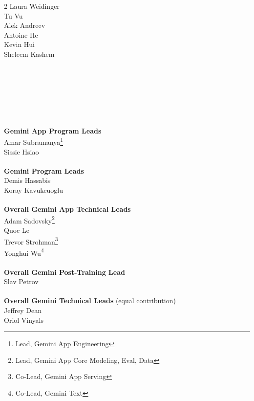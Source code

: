 \begin{multicols}{2}
Laura Weidinger \\
Tu Vu \\
Alek Andreev \\
Antoine He \\
Kevin Hui \\
Sheleem Kashem \\
\\
\\
\\
\\
\\
\\
\\
\textbf{Gemini App Program Leads} \\
Amar Subramanya\footnote{Lead, Gemini App Engineering} \\ 
Sissie Hsiao \\
\\
\textbf{Gemini Program Leads} \\
Demis Hassabis \\
Koray Kavukcuoglu \\
\\
\textbf{Overall Gemini App Technical Leads} \\
Adam Sadovsky\footnote{Lead, Gemini App Core Modeling, Eval, Data} \\
Quoc Le \\ 
Trevor Strohman\footnote{Co-Lead, Gemini App Serving} \\
Yonghui Wu\footnote{Co-Lead, Gemini Text} \\
\\
\textbf{Overall Gemini Post-Training Lead} \\
Slav Petrov \\
\\
\textbf{Overall Gemini Technical Leads} (equal contribution) \\
Jeffrey Dean \\
Oriol Vinyals \\
\end{multicols}
\setlength{\footskip}{0.4cm}

